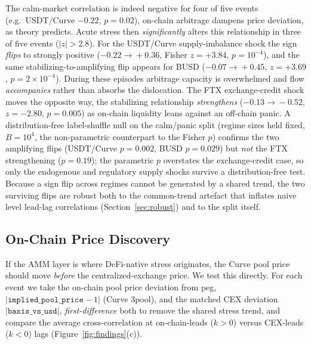 \documentclass[sigconf,anonymous]{acmart}
\begin{document}
The calm-market correlation is indeed negative for four of five events
(e.g.\ USDT/Curve $-0.22$, $p=0.02$), on-chain arbitrage dampens price
deviation, as theory predicts.  Acute stress then \emph{significantly} alters
this relationship in three of five events ($|z|>2.8$).  For the USDT/Curve
supply-imbalance shock the sign \emph{flips} to strongly positive
($-0.22\!\to\!+0.36$, Fisher $z=+3.84$, $p=10^{-4}$), and the same
stabilizing-to-amplifying flip appears for BUSD ($-0.07\!\to\!+0.45$,
$z=+3.69$, $p=2\times10^{-4}$). During these episodes arbitrage capacity is
overwhelmed and flow \emph{accompanies} rather than absorbs the dislocation.
The FTX exchange-credit shock moves the opposite way, the stabilizing
relationship \emph{strengthens} ($-0.13\!\to\!-0.52$, $z=-2.80$, $p=0.005$)
as on-chain liquidity leans against an off-chain panic.  A distribution-free
label-shuffle null on the calm/panic split (regime sizes held fixed, $B{=}10^4$,
the non-parametric counterpart to the Fisher $p$) confirms the two amplifying
flips (USDT/Curve $p=0.002$, BUSD $p=0.029$) but \emph{not} the FTX strengthening
($p=0.19$); the parametric $p$ overstates the exchange-credit case, so only the
endogenous and regulatory supply shocks survive a distribution-free test. Because a sign flip
across regimes cannot be generated by a shared trend, the two surviving flips are robust both to
the common-trend artefact that inflates naive level lead-lag
correlations (Section~\ref{sec:robust}) and to the split itself.





\subsection{On-Chain Price Discovery}
\label{sec:pricediscovery}

If the AMM layer is where DeFi-native stress originates, the Curve pool price
should move \emph{before} the centralized-exchange price.  We test this
directly.  For each event we take the on-chain pool price deviation from peg,
$|\texttt{implied\_pool\_price}-1|$ (Curve 3pool), and the matched CEX
deviation $|\texttt{basis\_vs\_usd}|$, \emph{first-difference} both to remove
the shared stress trend, and compare the average cross-correlation at
on-chain-leads ($k>0$) versus CEX-leads ($k<0$) lags (Figure~\ref{fig:findings}(c)).
\end{document}
